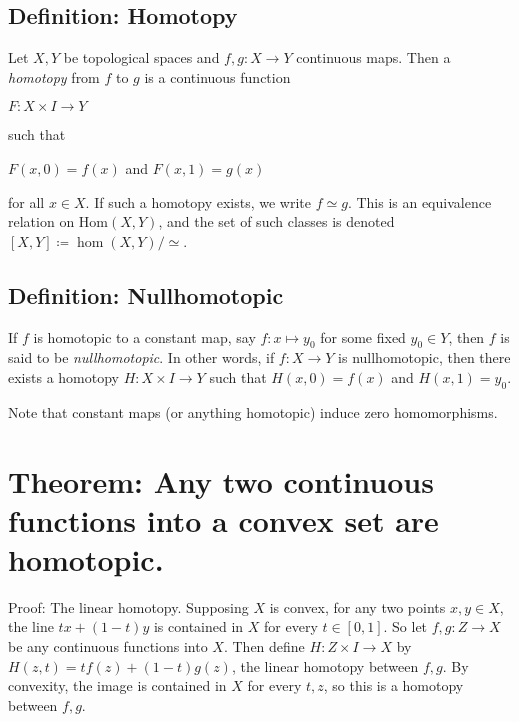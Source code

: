 \hypertarget{definition-homotopy}{%
\subsection{Definition: Homotopy}\label{definition-homotopy}}

Let \(X, Y\) be topological spaces and \(f,g: X \to Y\) continuous maps.
Then a \emph{homotopy} from \(f\) to \(g\) is a continuous function

\(F: X \times I \to Y\)

such that

\(F(x, 0) = f(x)\) and \(F(x,1) = g(x)\)

for all \(x\in X\). If such a homotopy exists, we write \(f\simeq g\).
This is an equivalence relation on \(\text{Hom}(X,Y)\), and the set of
such classes is denoted \([X,Y] \coloneqq\hom (X,Y)/\simeq\).

\hypertarget{definition-nullhomotopic}{%
\subsection{Definition: Nullhomotopic}\label{definition-nullhomotopic}}

If \(f\) is homotopic to a constant map, say \(f: x \mapsto y_0\) for
some fixed \(y_0 \in Y\), then \(f\) is said to be \emph{nullhomotopic}.
In other words, if \(f:X\to Y\) is nullhomotopic, then there exists a
homotopy \(H: X\times I \to Y\) such that \(H(x, 0) = f(x)\) and
\(H(x, 1) = y_0\).

Note that constant maps (or anything homotopic) induce zero
homomorphisms.

\hypertarget{theorem-any-two-continuous-functions-into-a-convex-set-are-homotopic.}{%
\section{Theorem: Any two continuous functions into a convex set are
homotopic.}\label{theorem-any-two-continuous-functions-into-a-convex-set-are-homotopic.}}

Proof: The linear homotopy. Supposing \(X\) is convex, for any two
points \(x,y\in X\), the line \(tx + (1-t)y\) is contained in \(X\) for
every \(t\in[0,1]\). So let \(f, g: Z \to X\) be any continuous
functions into \(X\). Then define \(H: Z \times I \to X\) by
\(H(z,t) = tf(z) + (1-t)g(z)\), the linear homotopy between \(f,g\). By
convexity, the image is contained in \(X\) for every \(t,z\), so this is
a homotopy between \(f,g\).

